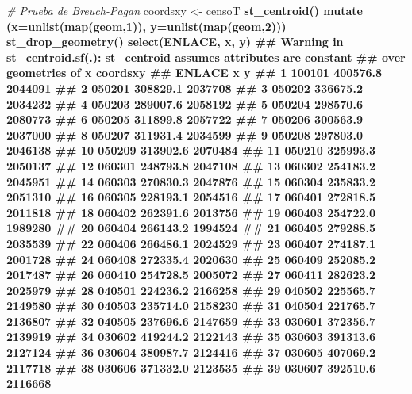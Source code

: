 \documentclass[11pt,]{article}
\newenvironment{Shaded}{\begin{snugshade}}{\end{snugshade}}
\newcommand{\KeywordTok}[1]{\textcolor[rgb]{0.13,0.29,0.53}{\textbf{#1}}}
\newcommand{\DataTypeTok}[1]{\textcolor[rgb]{0.13,0.29,0.53}{#1}}
\newcommand{\DecValTok}[1]{\textcolor[rgb]{0.00,0.00,0.81}{#1}}
\newcommand{\StringTok}[1]{\textcolor[rgb]{0.31,0.60,0.02}{#1}}
\newcommand{\CommentTok}[1]{\textcolor[rgb]{0.56,0.35,0.01}{\textit{#1}}}
\newcommand{\OperatorTok}[1]{\textcolor[rgb]{0.81,0.36,0.00}{\textbf{#1}}}
\newcommand{\NormalTok}[1]{#1}
\begin{document}
\begin{Shaded}
\begin{Highlighting}[]
\CommentTok{# Prueba de Breuch-Pagan}
\NormalTok{coordsxy <-}\StringTok{ }\NormalTok{censoT }\OperatorTok{%
\StringTok{  }\KeywordTok{st_centroid}\NormalTok{() }\OperatorTok{%
\StringTok{     }\KeywordTok{mutate}\NormalTok{ (}\DataTypeTok{x=}\KeywordTok{unlist}\NormalTok{(}\KeywordTok{map}\NormalTok{(geom,}\DecValTok{1}\NormalTok{)),}
             \DataTypeTok{y=}\KeywordTok{unlist}\NormalTok{(}\KeywordTok{map}\NormalTok{(geom,}\DecValTok{2}\NormalTok{))) }\OperatorTok{%
\StringTok{  }\KeywordTok{st_drop_geometry}\NormalTok{() }\OperatorTok{%
\StringTok{  }\KeywordTok{select}\NormalTok{(ENLACE, x, y)}
\NormalTok{## Warning in st_centroid.sf(.): st_centroid assumes attributes are constant}
\NormalTok{## over geometries of x}
\NormalTok{coordsxy}
\NormalTok{##     ENLACE        x       y}
\NormalTok{## 1   100101 400576.8 2044091}
\NormalTok{## 2   050201 308829.1 2037708}
\NormalTok{## 3   050202 336675.2 2034232}
\NormalTok{## 4   050203 289007.6 2058192}
\NormalTok{## 5   050204 298570.6 2080773}
\NormalTok{## 6   050205 311899.8 2057722}
\NormalTok{## 7   050206 300563.9 2037000}
\NormalTok{## 8   050207 311931.4 2034599}
\NormalTok{## 9   050208 297803.0 2046138}
\NormalTok{## 10  050209 313902.6 2070484}
\NormalTok{## 11  050210 325993.3 2050137}
\NormalTok{## 12  060301 248793.8 2047108}
\NormalTok{## 13  060302 254183.2 2045951}
\NormalTok{## 14  060303 270830.3 2047876}
\NormalTok{## 15  060304 235833.2 2051310}
\NormalTok{## 16  060305 228193.1 2054516}
\NormalTok{## 17  060401 272818.5 2011818}
\NormalTok{## 18  060402 262391.6 2013756}
\NormalTok{## 19  060403 254722.0 1989280}
\NormalTok{## 20  060404 266143.2 1994524}
\NormalTok{## 21  060405 279288.5 2035539}
\NormalTok{## 22  060406 266486.1 2024529}
\NormalTok{## 23  060407 274187.1 2001728}
\NormalTok{## 24  060408 272335.4 2020630}
\NormalTok{## 25  060409 252085.2 2017487}
\NormalTok{## 26  060410 254728.5 2005072}
\NormalTok{## 27  060411 282623.2 2025979}
\NormalTok{## 28  040501 224236.2 2166258}
\NormalTok{## 29  040502 225565.7 2149580}
\NormalTok{## 30  040503 235714.0 2158230}
\NormalTok{## 31  040504 221765.7 2136807}
\NormalTok{## 32  040505 237696.6 2147659}
\NormalTok{## 33  030601 372356.7 2139919}
\NormalTok{## 34  030602 419244.2 2122143}
\NormalTok{## 35  030603 391313.6 2127124}
\NormalTok{## 36  030604 380987.7 2124416}
\NormalTok{## 37  030605 407069.2 2117718}
\NormalTok{## 38  030606 371332.0 2123535}
\NormalTok{## 39  030607 392510.6 2116668}
}}}}
\end{Highlighting}
\end{Shaded}
\end{document}
